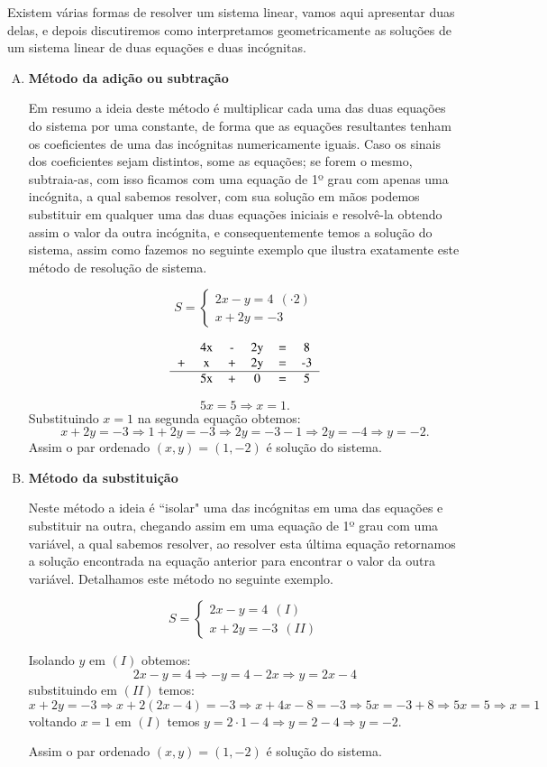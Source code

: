 Existem várias formas de resolver um sistema linear, vamos aqui apresentar duas delas, e depois discutiremos como interpretamos geometricamente as soluções de um sistema linear de duas equações e duas incógnitas.

\begin{enumerate}[A)]
 \item \textbf{Método da adição ou subtração}

 Em resumo a ideia deste método é multiplicar cada uma das duas equações do sistema por uma constante, de forma que as equações resultantes tenham os coeficientes de uma das incógnitas numericamente iguais. Caso os sinais dos coeficientes sejam distintos, some as equações; se forem o mesmo, subtraia-as, com isso ficamos com uma equação de 1º grau com apenas uma incógnita, a qual sabemos resolver, com sua solução em mãos podemos substituir em qualquer uma das duas equações iniciais e resolvê-la obtendo assim o valor da outra incógnita, e consequentemente temos a solução do sistema, assim como fazemos no seguinte exemplo que ilustra exatamente este método de resolução de sistema.

 \[S= \begin{cases}
      2x - y= 4 \ \ (\cdot 2)\\
      x + 2y= -3
     \end{cases}\]

$$\begin{tabular}{cccccc}
   & 4x & -  & 2y  & =  & 8  \\
 + & x & + & 2y & = & -3 \\\hline
   & 5x & + & 0 & = & 5 \\
\end{tabular}$$

\[5x= 5 \Rightarrow x=1.\]
Substituindo $x=1$ na segunda equação obtemos:
\[x + 2y= -3 \Rightarrow 1 + 2y= -3 \Rightarrow 2y = -3 -1 \Rightarrow 2y= -4 \Rightarrow y=-2.\]
Assim o par ordenado $(x, y)= (1, -2)$ é solução do sistema.

 \item \textbf{Método da substituição}

 Neste método a ideia é ``isolar" uma das incógnitas em uma das equações e substituir na outra, chegando assim em uma equação de 1º grau com uma variável, a qual sabemos resolver, ao resolver esta última equação retornamos a solução encontrada na equação anterior para encontrar o valor da outra variável. Detalhamos este método no seguinte exemplo.

 \[S= \begin{cases}
      2x - y= 4 \ \ (I)\\
      x + 2y= -3 \ \ (II)
     \end{cases}\]

 Isolando $y$ em $(I)$ obtemos:
 \[2x - y= 4 \Rightarrow -y = 4 -2x \Rightarrow y = 2x -4\]
 substituindo em $(II)$ temos:
 \[x + 2y= -3 \Rightarrow x + 2(2x - 4)= -3 \Rightarrow x + 4x - 8= -3 \Rightarrow 5x= -3 + 8 \Rightarrow 5x=5 \Rightarrow x=1\]
 voltando $x= 1$ em $(I)$ temos $y= 2 \cdot 1 - 4 \Rightarrow  y= 2 -4 \Rightarrow y= -2$.

 Assim o par ordenado $(x, y)= (1, -2)$ é solução do sistema.
\end{enumerate}

